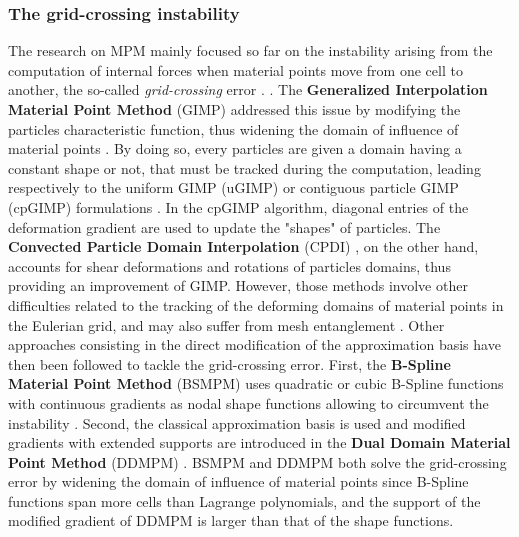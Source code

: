 \subsubsection*{The grid-crossing instability}
The research on MPM mainly focused so far on the instability arising from the computation of internal forces when material points move from one cell to another, the so-called \textit{grid-crossing} error \cite{Gimp}. . 
 The \textbf{Generalized Interpolation Material Point Method} (GIMP) addressed this issue by modifying the particles characteristic function, thus widening the domain of influence of material points \cite{Gimp}. By doing so, every particles are given a domain having a constant shape or not, that must be tracked during the computation, leading respectively to the uniform GIMP (uGIMP) or contiguous particle GIMP (cpGIMP) formulations \cite{Book_MPM}. In the cpGIMP algorithm, diagonal entries of the deformation gradient are used to update the "shapes" of particles. The \textbf{Convected Particle Domain Interpolation} (CPDI) \cite{CPDI}, on the other hand, accounts for shear deformations and rotations of particles domains, thus providing an improvement of GIMP. However, those methods involve other difficulties related to the tracking of the deforming domains of material points in the Eulerian grid, and may also suffer from mesh entanglement \cite{DDMPM0}. Other approaches consisting in the direct modification of the approximation basis have then been followed to tackle the grid-crossing error. First, the \textbf{B-Spline Material Point Method} (BSMPM) \cite{Steffen_quadError} uses quadratic or cubic B-Spline functions with continuous gradients as nodal shape functions allowing to circumvent the instability \cite{MPM_BSpline1}. %
Second, the classical approximation basis is used and modified gradients with extended supports are introduced in the \textbf{Dual Domain Material Point Method} (DDMPM) \cite{DDMPM0}. BSMPM and DDMPM  both solve the grid-crossing error by widening the domain of influence of material points since B-Spline functions span more cells than Lagrange polynomials, and the support of the modified gradient of DDMPM is larger than that of the shape functions.

